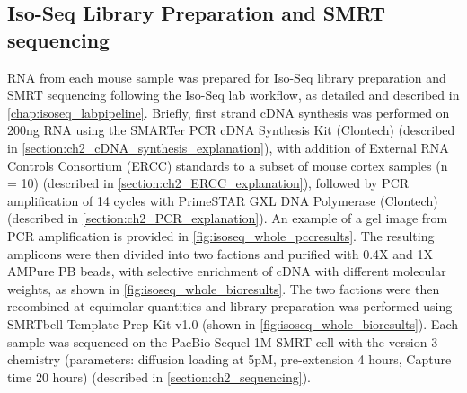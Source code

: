\subsection{Iso-Seq Library Preparation and SMRT sequencing}\label{ch4_methods: isoseq_library}
RNA from each mouse sample was prepared for Iso-Seq library preparation and SMRT sequencing following the Iso-Seq lab workflow, as detailed and described in \cref{chap:isoseq_labpipeline}. Briefly, first strand cDNA synthesis was performed on 200ng RNA using the SMARTer PCR cDNA Synthesis Kit (Clontech) (described in \cref{section:ch2_cDNA_synthesis_explanation}), with addition of External RNA Controls Consortium (ERCC) standards to a subset of mouse cortex samples (n = 10) (described in \cref{section:ch2_ERCC_explanation}), followed by PCR amplification of 14 cycles with PrimeSTAR GXL DNA Polymerase (Clontech) (described in \cref{section:ch2_PCR_explanation}). An example of a gel image from PCR amplification is provided in \cref{fig:isoseq_whole_pccresults}. The resulting amplicons were then divided into two factions and purified with 0.4X and 1X AMPure PB beads, with selective enrichment of cDNA with different molecular weights, as shown in \cref{fig:isoseq_whole_bioresults}. The two factions were then recombined at equimolar quantities and library preparation was performed using SMRTbell Template Prep Kit v1.0 (shown in \cref{fig:isoseq_whole_bioresults}). Each sample was sequenced on the PacBio Sequel 1M SMRT cell with the version 3 chemistry (parameters: diffusion loading at 5pM, pre-extension 4 hours, Capture time 20 hours) (described in \cref{section:ch2_sequencing}).

